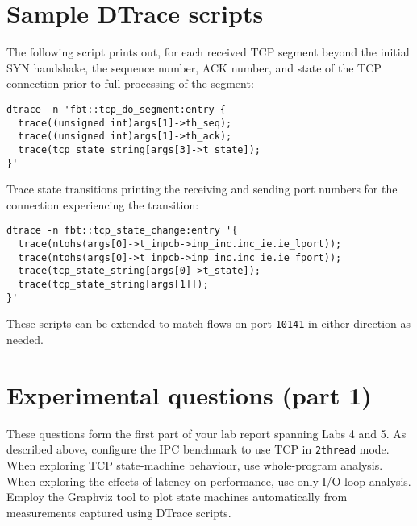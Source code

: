 \documentclass[a4paper,10pt]{article}
\begin{document}
\section*{Sample DTrace scripts}

The following script prints out, for each received TCP segment beyond the
initial SYN handshake, the sequence number, ACK number, and state of the TCP
connection prior to full processing of the segment:

\begin{verbatim}
dtrace -n 'fbt::tcp_do_segment:entry {
  trace((unsigned int)args[1]->th_seq);
  trace((unsigned int)args[1]->th_ack);
  trace(tcp_state_string[args[3]->t_state]);
}'
\end{verbatim}

\noindent
Trace state transitions printing the receiving and sending port numbers for
the connection experiencing the transition:

\begin{verbatim}
dtrace -n fbt::tcp_state_change:entry '{
  trace(ntohs(args[0]->t_inpcb->inp_inc.inc_ie.ie_lport));
  trace(ntohs(args[0]->t_inpcb->inp_inc.inc_ie.ie_fport));
  trace(tcp_state_string[args[0]->t_state]);
  trace(tcp_state_string[args[1]]);
}'
\end{verbatim}

\noindent
These scripts can be extended to match flows on port \texttt{10141} in either
direction as needed.

\section*{Experimental questions (part 1)}

These questions form the first part of your lab report spanning Labs 4 and 5.
As described above, configure the IPC benchmark to use TCP in \texttt{2thread}
mode.
When exploring TCP state-machine behaviour, use whole-program analysis.
When exploring the effects of latency on performance, use only I/O-loop
analysis.
Employ the Graphviz tool to plot state machines automatically from
measurements captured using DTrace scripts.
\end{document}
